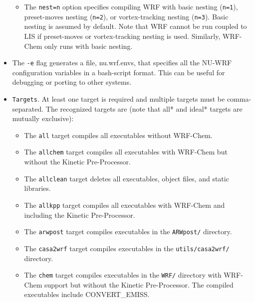 \begin{itemize}
\begin{itemize}
    \item The \texttt{nest=n} option specifies compiling WRF with basic
      nesting (\texttt{n=1}), preset-moves nesting (\texttt{n=2}), or 
      vortex-tracking nesting (\texttt{n=3}). Basic nesting is assumed by 
      default. Note that WRF cannot be run coupled to LIS if preset-moves
      or vortex-tracking nesting is used. Similarly, WRF-Chem only runs
      with basic nesting.
            
  \end{itemize}

  \item The \texttt{-e} flag generates a file, nu.wrf.envs, that specifies
   all the NU-WRF configuration variables in a bash-script format.
   This can be useful for debugging or porting to other systems.
 
\item \texttt{Targets}. At least one target is required and multiple targets must be 
  comma-separated. The recognized targets are (note that all* and ideal* targets are 
  mutually exclusive):

  \begin{itemize}

  \item The \texttt{all} target compiles all executables without WRF-Chem.

  \item The \texttt{allchem} target compiles all executables with WRF-Chem but
    without the Kinetic Pre-Processor.

  \item The \texttt{allclean} target deletes all executables, object files,
    and static libraries.

  \item The \texttt{allkpp} target compiles all executables with WRF-Chem and
    including the Kinetic Pre-Processor.

  \item The \texttt{arwpost} target compiles executables in the 
    \texttt{ARWpost/} directory.

  \item The \texttt{casa2wrf} target compiles executables in the
    \texttt{utils/casa2wrf/} directory.

  \item The \texttt{chem} target compiles executables in the 
    \texttt{WRF/} directory with WRF-Chem support but 
    without the Kinetic Pre-Processor. The compiled executables include 
    CONVERT\_EMISS.


\end{itemize}
\end{itemize}
